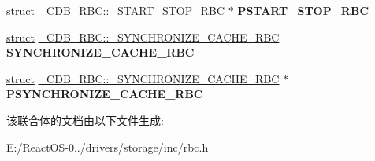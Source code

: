 \begin{DoxyCompactItemize}
\hyperlink{interfacestruct}{struct} \hyperlink{struct___c_d_b___r_b_c_1_1___s_t_a_r_t___s_t_o_p___r_b_c}{\+\_\+\+C\+D\+B\+\_\+\+R\+B\+C\+::\+\_\+\+S\+T\+A\+R\+T\+\_\+\+S\+T\+O\+P\+\_\+\+R\+BC} $\ast$ {\bfseries P\+S\+T\+A\+R\+T\+\_\+\+S\+T\+O\+P\+\_\+\+R\+BC}
\item 
\mbox{\label{union___c_d_b___r_b_c_a56f4b4600a65f12b137ad757bd20b15d}} 
\hyperlink{interfacestruct}{struct} \hyperlink{struct___c_d_b___r_b_c_1_1___s_y_n_c_h_r_o_n_i_z_e___c_a_c_h_e___r_b_c}{\+\_\+\+C\+D\+B\+\_\+\+R\+B\+C\+::\+\_\+\+S\+Y\+N\+C\+H\+R\+O\+N\+I\+Z\+E\+\_\+\+C\+A\+C\+H\+E\+\_\+\+R\+BC} {\bfseries S\+Y\+N\+C\+H\+R\+O\+N\+I\+Z\+E\+\_\+\+C\+A\+C\+H\+E\+\_\+\+R\+BC}
\item 
\mbox{\label{union___c_d_b___r_b_c_a1c2f81c76a8ae9df88778d5d0e7f64d6}} 
\hyperlink{interfacestruct}{struct} \hyperlink{struct___c_d_b___r_b_c_1_1___s_y_n_c_h_r_o_n_i_z_e___c_a_c_h_e___r_b_c}{\+\_\+\+C\+D\+B\+\_\+\+R\+B\+C\+::\+\_\+\+S\+Y\+N\+C\+H\+R\+O\+N\+I\+Z\+E\+\_\+\+C\+A\+C\+H\+E\+\_\+\+R\+BC} $\ast$ {\bfseries P\+S\+Y\+N\+C\+H\+R\+O\+N\+I\+Z\+E\+\_\+\+C\+A\+C\+H\+E\+\_\+\+R\+BC}
\end{DoxyCompactItemize}


该联合体的文档由以下文件生成\+:\begin{DoxyCompactItemize}
\item 
E\+:/\+React\+O\+S-\/0../drivers/storage/inc/rbc.\+h\end{DoxyCompactItemize}
